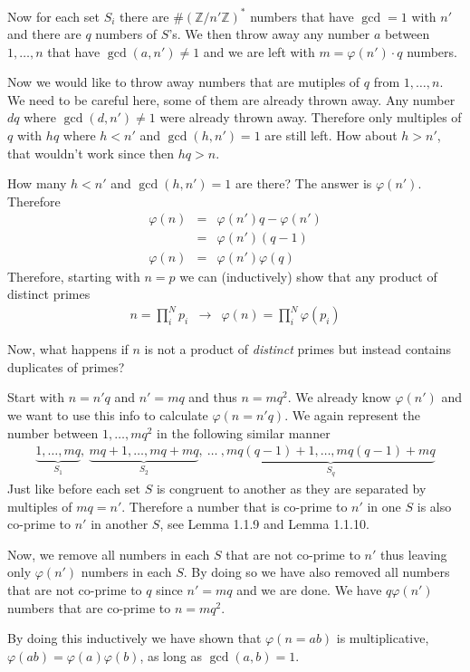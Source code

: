 \documentclass[aps,preprint,preprintnumbers,nofootinbib,showpacs,prd]{revtex4-1}
\newcommand{\nbea}{\begin{eqnarray*}}
\newcommand{\neea}{\end{eqnarray*}}
\begin{document}
Now for each set $S_i$ there are $\#(\mathbb{Z}/n'\mathbb{Z})^*$ numbers that have $\gcd=1$ with $n'$ and there are $q$ numbers of $S$'s. We then throw away any number $a$ between $1, \dots, n$ that have $\gcd(a,n') \neq 1$ and we are left with $m = \varphi(n') \cdot q$ numbers.

Now we would like to throw away numbers that are mutiples of $q$ from $1, \dots, n$. We need to be careful here, some of them are already thrown away. Any number $dq$ where $\gcd(d,n') \neq 1$ were already thrown away. Therefore only multiples of $q$ with $hq$ where $h < n'$ and $\gcd(h,n')=1$ are still left. How about $h > n'$, that wouldn't work since then $hq > n$.

How many $h < n'$ and $\gcd(h,n')=1$ are there? The answer is $\varphi(n')$. Therefore
%
\nbea
\varphi(n) & = & \varphi(n')q - \varphi(n') \\
& = & \varphi(n')(q - 1) \\
\varphi(n) & = & \varphi(n') \varphi(q) 
\neea
%
Therefore, starting with $n = p$ we can (inductively) show that any product of distinct primes
%
\nbea
n = \prod_i^{N} p_i & \to & \varphi(n) = \prod_i^{N} \varphi(p_i)
\neea
%

Now, what happens if $n$ is not a product of {\it distinct} primes but instead contains duplicates of primes? 

Start with $n = n' q$ and $n' = m q$ and thus $n = m q^2$. We already know $\varphi(n')$ and we want to use this info to calculate $\varphi(n = n'q)$. We again represent the number between $1, \dots, mq^2$ in the following similar manner
%
\nbea
\underbrace{1, \dots, mq}_\text{$S_1$}, ~ \underbrace{mq+1, \dots, mq+mq}_\text{$S_2$}, ~ \dots~, \underbrace{mq(q-1) + 1, \dots, mq(q-1) + mq}_\text{$S_q$}
\neea
%
Just like before each set $S$ is congruent to another as they are separated by multiples of $mq = n'$. Therefore a number that is co-prime to $n'$ in one $S$ is also co-prime to $n'$ in another $S$, see Lemma 1.1.9 and Lemma 1.1.10.

Now, we remove all numbers in each $S$ that are not co-prime to $n'$ thus leaving only $\varphi(n')$ numbers in each $S$. By doing so we have also removed all numbers that are not co-prime to $q$ since $n'=mq$ and we are done. We have $q\varphi(n')$ numbers that are co-prime to $n = mq^2$.

By doing this inductively we have shown that $\varphi(n=ab)$ is multiplicative, $\varphi(ab) = \varphi(a)\varphi(b)$, as long as $\gcd(a,b) = 1$.
\end{document}
